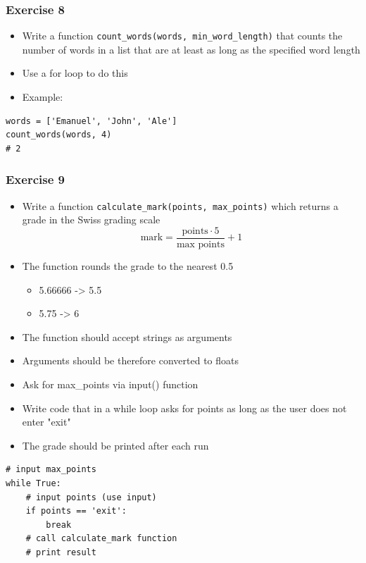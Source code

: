 \documentclass[10pt, a4paper]{beamer} %
\begin{document}
{\begin{frame}[c, fragile]\frametitle{Exercise 8}
\begin{itemize}
\item Write a function \texttt{count\_words(words, min\_word\_length)} that counts the number of words in a list that are at least as long as the specified word length
\item Use a for loop to do this
\item Example:
\end{itemize}

{
\mdseries
{}
\begin{lstlisting}
words = ['Emanuel', 'John', 'Ale']
count_words(words, 4)
# 2
\end{lstlisting}
}

\end{frame}

\begin{frame}\frametitle{Exercise 9}
    
\begin{itemize}
    \item Write a function \texttt{calculate\_mark(points, max\_points)} which returns a grade in the Swiss grading scale
    \[ \text{mark} = \frac{\text{points}\cdot 5}{\text{max points}} + 1 \]
    \item The function rounds the grade to the nearest 0.5
    \begin{itemize}
        \item 5.66666 -> 5.5
        \item 5.75 -> 6
    \end{itemize}
    \item The function should accept strings as arguments
    \item Arguments should be therefore converted to floats
\end{itemize}

\framebreak

\begin{itemize}
    \item Ask for max\_points via input() function
    \item Write code that in a while loop asks for points as long as the user does not enter "exit"
    \item The grade should be printed after each run
\end{itemize}

{
\mdseries
{}
\begin{lstlisting}
# input max_points
while True:
    # input points (use input)
    if points == 'exit':
        break
    # call calculate_mark function
    # print result
\end{lstlisting}
}
\framebreak


\end{frame}}
\end{document}
